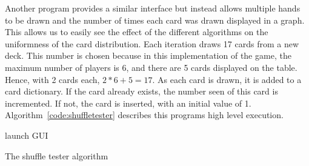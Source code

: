 Another program provides a similar interface but instead allows multiple hands 
to be drawn and the number of times each card was drawn displayed in a graph. 
This allows us to easily see the effect of the different algorithms on the 
uniformness of the card distribution. Each iteration draws 17 cards from
a new deck. This number is chosen because in this implementation of the game,
the maximum number of players is 6, and there are 5 cards displayed on the
table. Hence, with 2 cards each, $2 * 6 + 5 = 17$. As each card is drawn,
it is added to a card dictionary. If the card already exists, the number seen
of this card is incremented. If not, the card is inserted, with an initial
value of 1. Algorithm~\ref{code:shuffletester} describes this programs high
level execution.

\vspace{0.3cm}

\begin{algorithm}[H]
    launch GUI\;
\caption{The shuffle tester algorithm}%
\label{code:shuffletester}
\end{algorithm}

\vspace{0.3cm}

